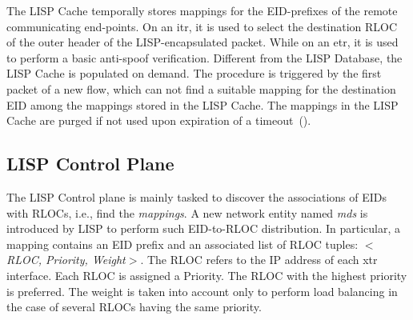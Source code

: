 The LISP Cache temporally stores mappings for the EID-prefixes of the remote communicating end-points. On an \acrshort{itr}, it is used to select the destination RLOC of the outer header of the LISP-encapsulated packet. While on an \acrshort{etr}, it is used to perform a basic anti-spoof verification. Different from the LISP Database, the LISP Cache is populated on demand. The procedure is triggered by the first packet of a new flow, which can not find a suitable mapping for the destination EID among the mappings stored in the LISP Cache. The mappings in the LISP Cache are purged if not used upon expiration of a timeout~(\cite{lispCacheCost,lispCacheDive,lispCacheLRU,lispCacheModel}).

\subsection{LISP Control Plane}
\label{sec:control_plane}

The LISP Control plane is mainly tasked to discover the associations of EIDs with RLOCs, i.e., find the \emph{mappings}. A new network entity named \emph{\acrfull{mds}} is introduced by LISP to perform such EID-to-RLOC distribution. In particular, a mapping contains an EID prefix and an associated list of RLOC tuples: \emph{$<$RLOC, Priority, Weight$>$}. The RLOC refers to the IP address of each \acrshort{xtr} interface. Each RLOC is assigned a Priority. The RLOC with the highest priority is preferred. %
The weight is taken into account only to perform load balancing in the case of several RLOCs having the same priority. %


